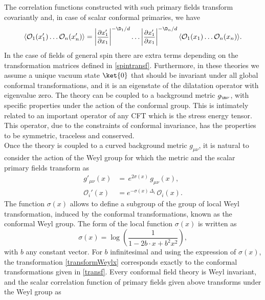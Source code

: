 \documentclass[a4paper,11pt,openright,twoside]{book}
\let\n=\nu      \let\x=\xi     \let\p=\pi      \let\r=\rho
\newcommand{\sdfrac}[2]{\mbox{\small$\displaystyle\frac{#1}{#2}$}}
\numberwithin{equation}{section}
\begin{document}
The correlation functions constructed with such primary fields transform covariantly and, in case of scalar conformal primaries, we have 
\begin{equation}
	\langle\mathcal{O}_1(x'_1)\dots \mathcal{O}_n(x'_n)\rangle=\left|\sdfrac{\partial x'_1}{\partial x_1}\right|^{-\D_1/d}\dots \left|\sdfrac{\partial x'_1}{\partial x_1}\right|^{-\D_n/d}\langle\mathcal{O}_1(x_1)\dots \mathcal{O}_n(x_n)\rangle.\label{invariance}
\end{equation}
In the case of fields of general spin there are extra terms depending on the transformation matrices defined in \eqref{spintransf}. Furthermore, in these theories we assume a unique vacuum state $\ket{0}$ that should be invariant under all global conformal transformations, and it is an eigenstate of the dilatation operator with eigenvalue zero. 
The theory can be coupled to a background metric $g_{\m\n}$, with specific properties under the action of the conformal group. This is intimately related to an important operator of any CFT which is the stress energy tensor. This operator, due to the constraints 
of conformal invariance, has the properties to be symmetric, traceless and conserved.\\
Once the theory is coupled to a curved background metric $g_{\mu\nu}$, it is natural to consider the action of the Weyl group for which the metric and the scalar primary fields transform as
\begin{equation}	
	\begin{split}
		g'_{\mu\nu}(x)&=\,e^{2\sigma(x)}\,g_{\mu\nu}(x),\\
		\mathcal{O}_i'(x)&=e^{-\sigma(x)\,\Delta_{i}}\,\mathcal{O}_i(x).
	\end{split}	\label{transformWeylx}
\end{equation}
The function $\sigma(x)$ allows to define a subgroup of the group of local Weyl transformation, induced by the conformal transformations, known as the conformal Weyl group. The form of the local function $\sigma(x)$ is written as
\begin{equation}
	\sigma(x)=\log\left(\frac{1}{1-2b\cdot x+b^2 x^2}\right),
\end{equation}
with $b$ any constant vector. For $b$ infinitesimal and using the expression of $\sigma(x)$, the transformation \eqref{transformWeylx} corresponds exactly to the conformal transformations given in \eqref{transf}. Every conformal field theory is Weyl invariant, and the scalar correlation function of primary fields given above transforms under the Weyl group as
\end{document}
